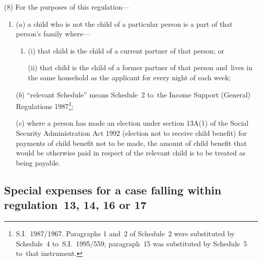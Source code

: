 \documentclass[12pt,a4paper]{article}
\begin{document}
(8) For the purposes of this regulation—
\begin{enumerate}\item[]

($a$) a child who is not the child of a particular person is a part of that person’s family where—
\begin{enumerate}\item[]
(i) that child is the child of a current partner of that person; or

(ii) that child is the child of a former partner of that person and~lives in the same household as the applicant for every night of each week;
\end{enumerate}

($b$) “relevant Schedule” means Schedule~2 to~the Income Support (General)
Regulations 1987\footnote{\frenchspacing S.I.~1987/1967. Paragraphs 1 and~2 of Schedule~2 were substituted by Schedule~4 to~S.I.~1995/559; paragraph~15 was substituted by Schedule~5 to~that instrument.};

($c$) where a person has made an election under section 13A(1) of the Social Security Administration Act 1992 (election not to receive child benefit) for payments of child benefit not to be made, the amount of child benefit that would be otherwise paid in respect of the relevant child is to be treated as being payable.
\end{enumerate}


\subsection[19. Special expenses for a case falling within regulation~13, 14, 16 or 17]{Special expenses for a case falling within regulation~13, 14, 16 or 17}
\end{document}
